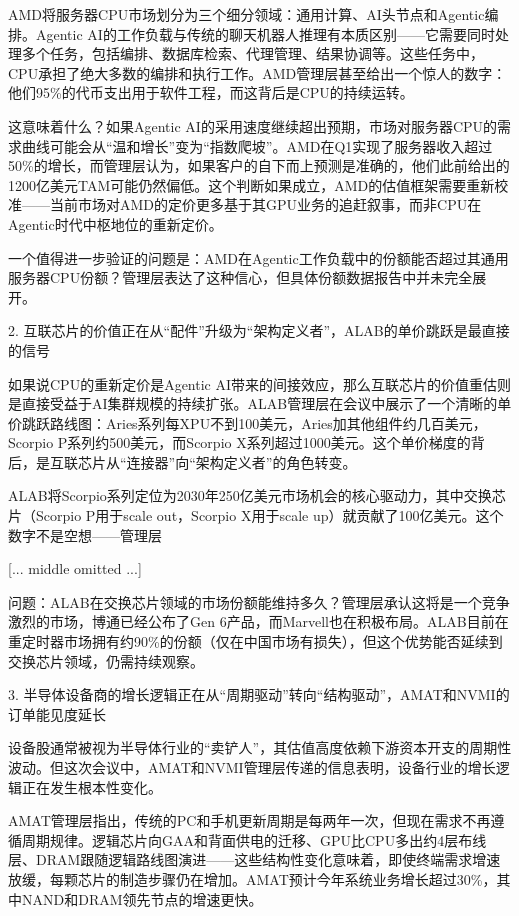 \documentclass[11pt]{ctexart}
\begin{document}
AMD将服务器CPU市场划分为三个细分领域：通用计算、AI头节点和Agentic编排。Agentic AI的工作负载与传统的聊天机器人推理有本质区别——它需要同时处理多个任务，包括编排、数据库检索、代理管理、结果协调等。这些任务中，CPU承担了绝大多数的编排和执行工作。AMD管理层甚至给出一个惊人的数字：他们95\%的代币支出用于软件工程，而这背后是CPU的持续运转。

这意味着什么？如果Agentic AI的采用速度继续超出预期，市场对服务器CPU的需求曲线可能会从“温和增长”变为“指数爬坡”。AMD在Q1实现了服务器收入超过50\%的增长，而管理层认为，如果客户的自下而上预测是准确的，他们此前给出的1200亿美元TAM可能仍然偏低。这个判断如果成立，AMD的估值框架需要重新校准——当前市场对AMD的定价更多基于其GPU业务的追赶叙事，而非CPU在Agentic时代中枢地位的重新定价。

一个值得进一步验证的问题是：AMD在Agentic工作负载中的份额能否超过其通用服务器CPU份额？管理层表达了这种信心，但具体份额数据报告中并未完全展开。

2. 互联芯片的价值正在从“配件”升级为“架构定义者”，ALAB的单价跳跃是最直接的信号

如果说CPU的重新定价是Agentic AI带来的间接效应，那么互联芯片的价值重估则是直接受益于AI集群规模的持续扩张。ALAB管理层在会议中展示了一个清晰的单价跳跃路线图：Aries系列每XPU不到100美元，Aries加其他组件约几百美元，Scorpio P系列约500美元，而Scorpio X系列超过1000美元。这个单价梯度的背后，是互联芯片从“连接器”向“架构定义者”的角色转变。

ALAB将Scorpio系列定位为2030年250亿美元市场机会的核心驱动力，其中交换芯片（Scorpio P用于scale out，Scorpio X用于scale up）就贡献了100亿美元。这个数字不是空想——管理层

[... middle omitted ...]

问题：ALAB在交换芯片领域的市场份额能维持多久？管理层承认这将是一个竞争激烈的市场，博通已经公布了Gen 6产品，而Marvell也在积极布局。ALAB目前在重定时器市场拥有约90\%的份额（仅在中国市场有损失），但这个优势能否延续到交换芯片领域，仍需持续观察。

3. 半导体设备商的增长逻辑正在从“周期驱动”转向“结构驱动”，AMAT和NVMI的订单能见度延长

设备股通常被视为半导体行业的“卖铲人”，其估值高度依赖下游资本开支的周期性波动。但这次会议中，AMAT和NVMI管理层传递的信息表明，设备行业的增长逻辑正在发生根本性变化。

AMAT管理层指出，传统的PC和手机更新周期是每两年一次，但现在需求不再遵循周期规律。逻辑芯片向GAA和背面供电的迁移、GPU比CPU多出约4层布线层、DRAM跟随逻辑路线图演进——这些结构性变化意味着，即使终端需求增速放缓，每颗芯片的制造步骤仍在增加。AMAT预计今年系统业务增长超过30\%，其中NAND和DRAM领先节点的增速更快。
\end{document}
